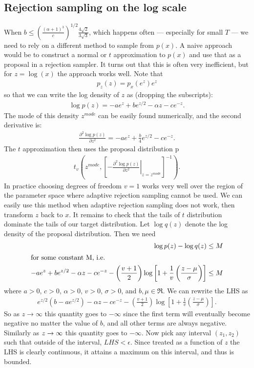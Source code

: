 \documentclass{article}
\begin{document}
\subsection{Rejection sampling on the log scale}

When $b \leq \left(\frac{(\alpha + 1)^3}{c}\right)^{1/2}\frac{4\sqrt{2}}{3\sqrt{3}}$, which happens often --- especially for small $T$ --- we need to rely on a different method to sample from $p(x)$. A naive approach would be to construct a normal or $t$ approximation to $p(x)$ and use that as a proposal in a rejection sampler. It turns out that this is often very inefficient, but for $z=\log(x)$ the approach works well. Note that
\begin{align*}
  p_z(z) = p_x(e^z)e^z
\end{align*}
so that we can write the log density of $z$ as (dropping the subscripts):
\begin{align*}
  \log p(z) = -ae^z + be^{z/2} - \alpha z - c e^{-z}.
\end{align*}
The mode of this density $z^{mode}$ can be easily found numerically, and the second derivative is:
\begin{align*}
  \frac{\partial^2 \log p(z)}{\partial z^2} = -ae^z + \frac{b}{4}e^{z/2} - c e^{-z}.
\end{align*}
The $t$ approximation then uses the proposal distribution 
p\begin{align*}
  t_{v}\left(z^{mode}, \left[-\left.\frac{\partial^2 \log p(z)}{\partial z^2}\right|_{z=z^{mode}}\right]^{-1}\right).
\end{align*}
In practice choosing degrees of freedom $v=1$ works very well over the region of the parameter space where adaptive rejection sampling cannot be used. We can easily use this method when adaptive rejection sampling does not work, then transform $z$ back to $x$. It remains to check that the tails of $t$ distribution dominate the tails of our target distribution. Let $\log q(z)$ denote the log density of the proposal distribution. Then we need
\begin{align*}
  \log p(z) - \log q(z) \leq M\\
  \intertext{for some constant M, i.e.}
  -ae^z + be^{z/2} - \alpha z - c e^{-z} -\left(\frac{v+1}{2}\right)\log\left[1 + \frac{1}{v}\left(\frac{z-\mu}{\sigma}\right)\right]\leq M
\end{align*}
where $a>0$, $c>0$, $\alpha>0$, $v>0$, $\sigma>0$, and $b,\mu\in \Re$. We can rewrite the LHS as
\begin{align*}
    e^{z/2}(b-ae^{z/2}) - \alpha z - c e^{-z} -\left(\frac{v+1}{2}\right)\log\left[1 + \frac{1}{v}\left(\frac{z-\mu}{\sigma}\right)\right].
\end{align*}
So as $z\to\infty$ this quantity goes to $-\infty$ since the first term will eventually become negative no matter the value of $b$, and all other terms are always negative. Similarly as $z\to\-\infty$ this quantity goes to $-\infty$. Now pick any interval $(z_1,z_2)$ such that outside of the interval, $LHS<\epsilon$. Since treated as a function of $z$ the LHS is clearly continuous, it attains a maximum on this interval, and thus is bounded.
\end{document}
